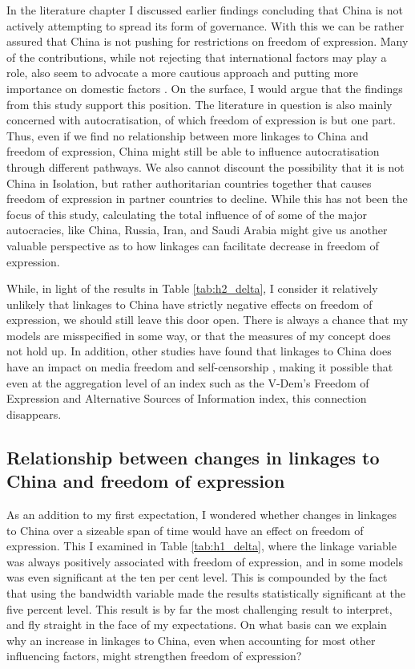 In the literature chapter I discussed earlier findings concluding that China is not actively attempting to spread its form of governance. With this we can be rather assured that China is not pushing for restrictions on freedom of expression. Many of the contributions, while not rejecting that international factors may play a role, also seem to advocate a more cautious approach and putting more importance on domestic factors \citep{bader_china_2015, buzogany_illiberal_2017, risse_democracy_2015}. On the surface, I would argue that the findings from this study support this position. The literature in question is also mainly concerned with autocratisation, of which freedom of expression is but one part. Thus, even if we find no relationship between more linkages to China and freedom of expression, China might still be able to influence autocratisation through different pathways. We also cannot discount the possibility that it is not China in Isolation, but rather authoritarian countries together that causes freedom of expression in partner countries to decline. While this has not been the focus of this study, calculating the total influence of of some of the major autocracies, like China, Russia, Iran, and Saudi Arabia might give us another valuable perspective as to how linkages can facilitate decrease in freedom of expression. 

While, in light of the results in Table \ref{tab:h2_delta}, I consider it relatively unlikely that linkages to China have strictly negative effects on freedom of expression, we should still leave this door open. There is always a chance that my models are misspecified in some way, or that the measures of my concept does not hold up. In addition, other studies have found that linkages to China does have an impact on media freedom and self-censorship \citep{gamso_is_2021, toettoe_foreign_2023}, making it possible that even at the aggregation level of an index such as the V-Dem's Freedom of Expression and Alternative Sources of Information index, this connection disappears. 

\subsection{Relationship between changes in linkages to China and freedom of expression}
As an addition to my first expectation, I wondered whether changes in linkages to China over a sizeable span of time would have an effect on freedom of expression. This I examined in Table \ref{tab:h1_delta}, where the linkage variable was always positively associated with freedom of expression, and in some models was even significant at the ten per cent level. This is compounded by the fact that using the bandwidth variable made the results statistically significant at the five percent level. This result is by far the most challenging result to interpret, and fly straight in the face of my expectations. On what basis can we explain why an increase in linkages to China, even when accounting for most other influencing factors, might strengthen freedom of expression?

